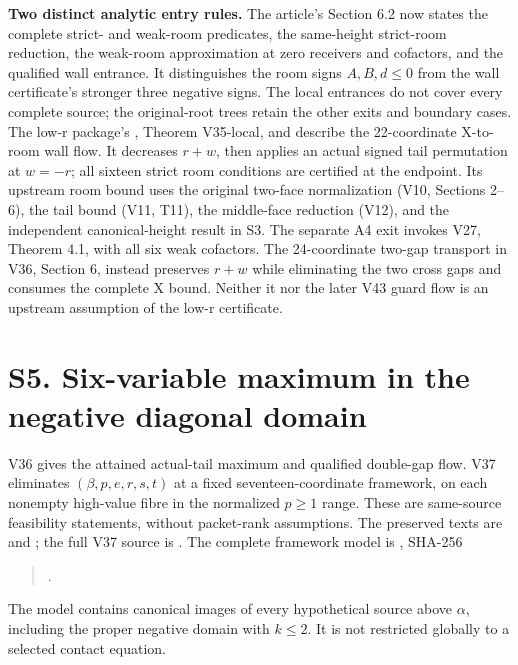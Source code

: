 \documentclass[10pt]{article}
\begin{document}
\textbf{Two distinct analytic entry rules.}
The article's Section 6.2 now states the complete strict- and weak-room
predicates, the same-height strict-room reduction, the weak-room
approximation at zero receivers and cofactors, and the qualified wall
entrance. It distinguishes the room signs \(A,B,d\le0\) from the
wall certificate's stronger three negative signs. The local entrances
do not cover every complete source; the original-root trees retain
the other exits and boundary cases.
The low-r package's , Theorem V35-local,
and  describe the 22-coordinate
X-to-room wall flow. It decreases \(r+w\), then applies an actual
signed tail permutation at \(w=-r\); all sixteen strict room
conditions are certified at the endpoint. Its upstream room bound
uses the original two-face normalization (V10, Sections 2--6),
the tail bound (V11, T11), the middle-face reduction (V12), and
the independent canonical-height result in S3. The separate A4
exit invokes V27, Theorem 4.1, with all six weak cofactors.
The 24-coordinate two-gap transport in V36, Section 6, instead
preserves \(r+w\) while eliminating the two cross gaps and consumes
the complete X bound. Neither it nor the later V43 guard flow
is an upstream assumption of the low-r certificate.

\section*{S5. Six-variable maximum in the negative diagonal domain}

V36 gives the attained actual-tail maximum and qualified double-gap
flow. V37 eliminates \((\beta,p,e,r,s,t)\) at a fixed seventeen-coordinate
framework, on each nonempty high-value fibre in the normalized
\(p\ge1\) range. These are same-source feasibility statements, without
packet-rank assumptions. The preserved texts are
 and
; the full V37 source is
.
The complete framework model is , SHA-256
\begin{quote}
.
\end{quote}
The model contains canonical images of every hypothetical source above
\(\alpha\), including the proper negative domain with \(k\le2\).
It is not restricted globally to a selected contact equation.
\end{document}
